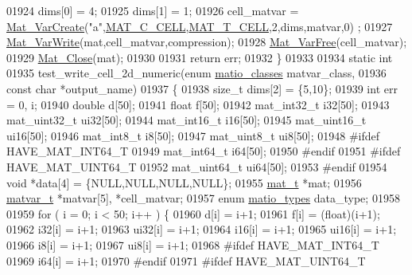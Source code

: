 \begin{DoxyCode}
{{{{{01924     dims[0] = 4;
01925     dims[1] = 1;
01926     cell\_matvar = \hyperlink{group___m_a_t_ga1c54a84bb4d810c6fccdb8869489eac4}{Mat\_VarCreate}(\textcolor{stringliteral}{"a"},\hyperlink{group___m_a_t_ggad4d60ae7b709fc81bfd744fb4c857c40a2f7abb47a1c51e248bd4e5e03cc81b08}{MAT\_C\_CELL},\hyperlink{group___m_a_t_ggacf7b3b879282b7ab3a51190e49bf3453a07599cf2cca6d2b2d059378563318ba5}{MAT\_T\_CELL},2,dims,matvar,0)
      ;
01927     \hyperlink{group___m_a_t_ga4bd3eba12df415d8226e27c457fbbb0b}{Mat\_VarWrite}(mat,cell\_matvar,compression);
01928     \hyperlink{group___m_a_t_ga1d14716f7450530fd1c9d02413787f0e}{Mat\_VarFree}(cell\_matvar);
01929     \hyperlink{group___m_a_t_ga101c92ff7bde4a2d4615661beba09262}{Mat\_Close}(mat);
01930 
01931     \textcolor{keywordflow}{return} err;
01932 \}
01933 
01934 \textcolor{keyword}{static} \textcolor{keywordtype}{int}
01935 test\_write\_cell\_2d\_numeric(\textcolor{keyword}{enum} \hyperlink{group___m_a_t_gad4d60ae7b709fc81bfd744fb4c857c40}{matio\_classes} matvar\_class,
01936     \textcolor{keyword}{const} \textcolor{keywordtype}{char} *output\_name)
01937 \{
01938     \textcolor{keywordtype}{size\_t} dims[2] = \{5,10\};
01939     \textcolor{keywordtype}{int}    err = 0, i;
01940     \textcolor{keywordtype}{double}    d[50];
01941     \textcolor{keywordtype}{float}     f[50];
01942     mat\_int32\_t   i32[50];
01943     mat\_uint32\_t ui32[50];
01944     mat\_int16\_t   i16[50];
01945     mat\_uint16\_t ui16[50];
01946     mat\_int8\_t    i8[50];
01947     mat\_uint8\_t  ui8[50];
01948 \textcolor{preprocessor}{#ifdef HAVE\_MAT\_INT64\_T}
01949     mat\_int64\_t i64[50];
01950 \textcolor{preprocessor}{#endif}
01951 \textcolor{preprocessor}{#ifdef HAVE\_MAT\_UINT64\_T}
01952     mat\_uint64\_t ui64[50];
01953 \textcolor{preprocessor}{#endif}
01954     \textcolor{keywordtype}{void} *data[4] = \{NULL,NULL,NULL,NULL\};
01955     \hyperlink{struct__mat__t}{mat\_t} *mat;
01956     \hyperlink{group___m_a_t_structmatvar__t}{matvar\_t} *matvar[5], *cell\_matvar;
01957     \textcolor{keyword}{enum} \hyperlink{group___m_a_t_gacf7b3b879282b7ab3a51190e49bf3453}{matio\_types} data\_type;
01958 
01959     \textcolor{keywordflow}{for} ( i = 0; i < 50; i++ ) \{
01960           d[i] = i+1;
01961           f[i] = (float)(i+1);
01962         i32[i] = i+1;
01963        ui32[i] = i+1;
01964         i16[i] = i+1;
01965        ui16[i] = i+1;
01966          i8[i] = i+1;
01967         ui8[i] = i+1;
01968 \textcolor{preprocessor}{#ifdef HAVE\_MAT\_INT64\_T}
01969         i64[i] = i+1;
01970 \textcolor{preprocessor}{#endif}
01971 \textcolor{preprocessor}{#ifdef HAVE\_MAT\_UINT64\_T}
}}}}}
\end{DoxyCode}
